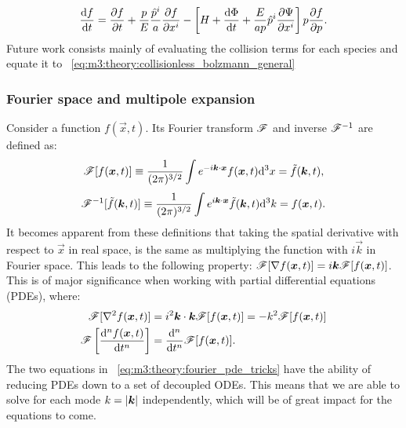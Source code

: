     \begin{equation}\label{eq:m3:theory:collisionless_bolzmann_general}
        \dv{f}{t} = \pdv{f}{t}+\frac{p}{E}\frac{\hat{p}^i}{a}\pdv{f}{x^i}-\left[H+\dv{\Phi}{t} + \frac{E}{ap}\hat{p}^i\pdv{\Psi}{x^i}\right]p\pdv{f}{p}.
    \end{equation}
    Future work consists mainly of evaluating the collision terms for each species and equate it to ~\cref{eq:m3:theory:collisionless_bolzmann_general}

\subsubsection{Fourier space and multipole expansion}
    Consider a function $f(\vec{x},t)$. Its Fourier transform $\mathscr{F}$ and inverse $\mathscr{F}^{-1}$ are defined as:
    \begin{equation}\label{eq:m3:theory:fourier_def}
            \mathscr{F}[f(\boldsymbol{x},t)]  \equiv \frac{1}{(2\pi)^{3/2}}\int e^{-i\boldsymbol{k}\cdot\boldsymbol{x}}f(\boldsymbol{x},t)\mathrm{d}^3 x = \tilde{f}(\boldsymbol{k},t),
    \end{equation}
    \begin{equation}\label{eq:m3:theory:fourier_inv_def}
        \mathscr{F}^{-1}[\tilde{f}(\boldsymbol{k},t)] \equiv \frac{1}{(2\pi)^{3/2}}\int e^{i\boldsymbol{k}\cdot\boldsymbol{x}}\tilde{f}(\boldsymbol{k},t)\mathrm{d}^3 k = f(\boldsymbol{x},t).
    \end{equation}
    It becomes apparent from these definitions that taking the spatial derivative with respect to $\vec{x}$ in real space, is the same as multiplying the function with $i\vec{k}$ in Fourier space. This leads to the following property: $\mathscr{F}[\nabla f(\boldsymbol{x},t)] = i\boldsymbol{k}\mathscr{F}[f(\boldsymbol{x},t)]$. This is of major significance when working with partial differential equations (PDEs), where:
    \begin{equation}\label{eq:m3:theory:fourier_pde_tricks}
        \begin{split}
            \mathscr{F}[\nabla^2f(\boldsymbol{x},t)] &= i^2\boldsymbol{k}\cdot\boldsymbol{k}\mathscr{F}[f(\boldsymbol{x},t)] = -k^2\mathscr{F}[f(\boldsymbol{x},t)]\\
            \mathscr{F}\left[\dv[n]{f(\ensuremath{\boldsymbol{x}},t)}{t}\right] &= \dv[n]{t}\mathscr{F}[f(\boldsymbol{x},t)].
        \end{split}
    \end{equation} 
    The two equations in ~\cref{eq:m3:theory:fourier_pde_tricks} have the ability of reducing PDEs down to a set of decoupled ODEs. This means that we are able to solve for each mode $k=\abs{\boldsymbol{k}}$ independently, which will be of great impact for the equations to come. 

